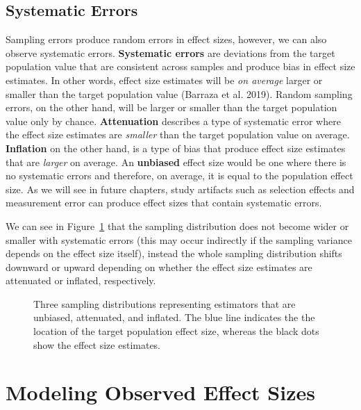 \documentclass[
  letterpaper,
  DIV=11,
  numbers=noendperiod]{scrreprt}
\begin{document}
\subsection{Systematic Errors}\label{systematic-errors}

Sampling errors produce random errors in effect sizes, however, we can
also observe systematic errors. \textbf{Systematic errors} are
deviations from the target population value that are consistent across
samples and produce bias in effect size estimates. In other words,
effect size estimates will be \emph{on average} larger or smaller than
the target population value (Barraza et al. 2019). Random sampling
errors, on the other hand, will be larger or smaller than the target
population value only by chance. \textbf{Attenuation} describes a type
of systematic error where the effect size estimates are \emph{smaller}
than the target population value on average. \textbf{Inflation} on the
other hand, is a type of bias that produce effect size estimates that
are \emph{larger} on average. An \textbf{unbiased} effect size would be
one where there is no systematic errors and therefore, on average, it is
equal to the population effect size. As we will see in future chapters,
study artifacts such as selection effects and measurement error can
produce effect sizes that contain systematic errors.

We can see in Figure~\ref{fig-systematic-errors} that the sampling
distribution does not become wider or smaller with systematic errors
(this may occur indirectly if the sampling variance depends on the
effect size itself), instead the whole sampling distribution shifts
downward or upward depending on whether the effect size estimates are
attenuated or inflated, respectively.

\begin{figure}[H]


\caption{\label{fig-systematic-errors}Three sampling distributions
representing estimators that are unbiased, attenuated, and inflated. The
blue line indicates the the location of the target population effect
size, whereas the black dots show the effect size estimates.}

\end{figure}%

\section{Modeling Observed Effect
Sizes}\label{modeling-observed-effect-sizes}
\end{document}
